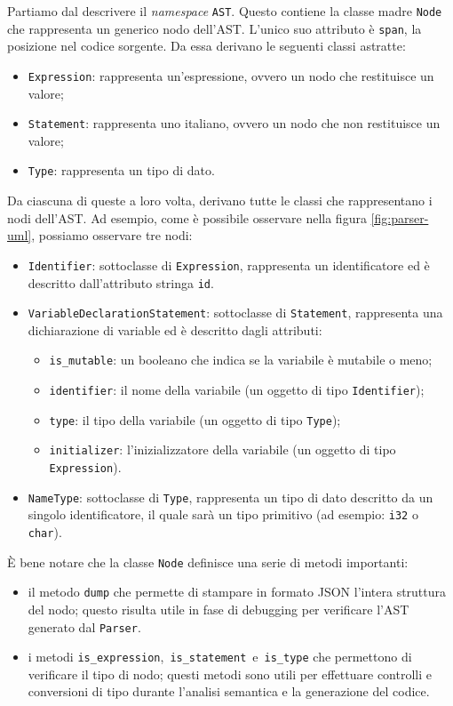 Partiamo dal descrivere il \textit{namespace} \texttt{AST}. Questo contiene la classe madre \texttt{Node} che rappresenta un generico nodo dell'AST. L'unico suo attributo \`e \texttt{span}, la posizione nel codice sorgente. Da essa derivano le seguenti classi astratte:
\begin{itemize}
	\item \texttt{Expression}: rappresenta un'espressione, ovvero un nodo che restituisce un valore;
	\item \texttt{Statement}: rappresenta uno italiano, ovvero un nodo che non restituisce un valore;
	\item \texttt{Type}: rappresenta un tipo di dato.
\end{itemize}
Da ciascuna di queste a loro volta, derivano tutte le classi che rappresentano i nodi dell'AST. Ad esempio, come \`e possibile osservare nella figura \ref{fig:parser-uml}, possiamo osservare tre nodi:
\begin{itemize}
	\item \texttt{Identifier}: sottoclasse di \texttt{Expression}, rappresenta un identificatore ed \`e descritto dall'attributo stringa \texttt{id}.
	\item \texttt{VariableDeclarationStatement}: sottoclasse di \texttt{Statement}, rappresenta una dichiarazione di variable ed \`e descritto dagli attributi:
	\begin{itemize}
		\item \texttt{is\_mutable}: un booleano che indica se la variabile \`e mutabile o meno;
		\item \texttt{identifier}: il nome della variabile (un oggetto di tipo \linebreak \texttt{Identifier});
		\item \texttt{type}: il tipo della variabile (un oggetto di tipo \texttt{Type});
		\item \texttt{initializer}: l'inizializzatore della variabile (un oggetto di tipo \texttt{Expression}).
	\end{itemize}
	\item \texttt{NameType}: sottoclasse di \texttt{Type}, rappresenta un tipo di dato descritto da un singolo identificatore, il quale sar\`a un tipo primitivo (ad esempio: \texttt{i32} o \texttt{char}).
\end{itemize}

\`E bene notare che la classe \texttt{Node} definisce una serie di metodi importanti:
\begin{itemize}
	\item il metodo \texttt{dump} che permette di stampare in formato JSON l'intera struttura del nodo; questo risulta utile in fase di debugging per verificare l'AST generato dal \texttt{Parser}.
	\item i metodi \mbox{\texttt{is\_expression}, \texttt{is\_statement} e \texttt{is\_type}} che permettono di verificare il tipo di nodo; questi metodi sono utili per effettuare controlli e conversioni di tipo durante l'analisi semantica e la generazione del codice.
\end{itemize}


